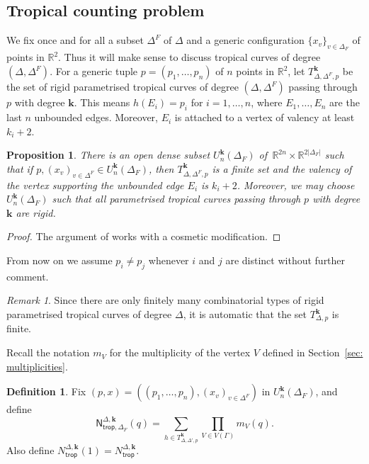 \documentclass[11pt]{amsart}
\numberwithin{equation}{section}
\theoremstyle{plain}
\newtheorem{proposition}[theorem]{Proposition}
\theoremstyle{remark}
\newtheorem{remark}[theorem]{Remark}
\theoremstyle{definition}
\newtheorem{definition}[theorem]{Definition}
\newcommand\bk{\mathbf{k}}
\newcommand{\Ntrop}{{N}_{\mathsf{trop}}^{\Delta,\bk}}
\begin{document}
\subsection{Tropical counting problem} We fix once and for all a subset $\Delta^F$ of $\Delta$ and a generic configuration $\{x_v\}_{v\in \Delta_F}$ of points in $\mathbb{R}^2$. Thus it will make sense to discuss tropical curves of degree $(\Delta,\Delta^F)$. For a generic tuple $p=(p_1,\dots,p_n)$  of $n$ points in $\mathbb{R}^2$, let $T_{\Delta,\Delta^F,p}^\bk$ be the set of rigid parametrised tropical curves  of degree $(\Delta,\Delta^F)$ passing through $p$ with degree $\bk$. This means $h(E_i) = p_i$ for $i = 1, \dots , n$, where $E_1,\dots,E_n$ are the last $n$ unbounded edges. Moreover, $E_i$ is attached to a vertex of valency at least $k_i + 2$.


\begin{proposition}\label{prop:TropCurveCount}
There is an open dense subset $U_{n}^\bk(\Delta_F)$ of\, $\mathbb{R}^{2n}\times \mathbb{R}^{2|\Delta_F|}$ such that if $p, (x_v)_{v\in \Delta^F}\in U_{n}^\bk(\Delta_F)$, then $T_{\Delta,\Delta^F,p}^\bk$ is a finite set and the valency of the vertex supporting the unbounded edge $E_i$ is $k_i + 2$. Moreover, we may choose $U_{n}^{\bk}(\Delta_F)$ such that all parametrised tropical curves passing through $p$ with degree $\bk$ are rigid.
\end{proposition}

\begin{proof}
    The argument of \cite[Proposition 1.4.1]{kennedyhunt2023tropical} works with a cosmetic modification.
\end{proof}

From now on we assume $p_i \neq p_j$ whenever $i$ and $j$ are distinct without further comment.

\begin{remark}
Since there are only finitely many combinatorial types of rigid parametrised tropical curves of degree $\Delta$, it is automatic that the set $T_{\Delta,p}^\bk$ is finite.
\end{remark} 

Recall the notation $m_V$ for the multiplicity of the vertex $V$ defined in Section~\ref{sec: multiplicities}.
 
\begin{definition}\label{defn:TropCurveCount}
  Fix $ (p,x) = ((p_1,\ldots,p_n),(x_v)_{v\in \Delta^F})$ in $U_n^\bk(\Delta_F)$, and define $$ \mathsf{N}^{\Delta,\bk}_{\mathsf{trop},\Delta_F}(q) =\sum_{h \in T_{\Delta,\Delta',p}^\bk} \prod_{V \in V(\Gamma)}m_V(q).$$
Also define  $\Ntrop(1)=\Ntrop$.
\end{definition}
\end{document}
